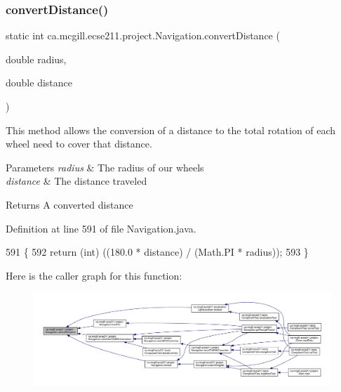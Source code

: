 \subsubsection{\texorpdfstring{convert\+Distance()}{convertDistance()}}
{\footnotesize\ttfamily static int ca.\+mcgill.\+ecse211.\+project.\+Navigation.\+convert\+Distance (\begin{DoxyParamCaption}\item[{double}]{radius,  }\item[{double}]{distance }\end{DoxyParamCaption})\hspace{0.3cm}{\ttfamily [static]}}

This method allows the conversion of a distance to the total rotation of each wheel need to cover that distance.


\begin{DoxyParams}{Parameters}
{\em radius} & The radius of our wheels \\
\hline
{\em distance} & The distance traveled \\
\hline
\end{DoxyParams}
\begin{DoxyReturn}{Returns}
A converted distance 
\end{DoxyReturn}


Definition at line 591 of file Navigation.\+java.


\begin{DoxyCode}
591                                                                     \{
592     \textcolor{keywordflow}{return} (\textcolor{keywordtype}{int}) ((180.0 * distance) / (Math.PI * radius));
593   \}
\end{DoxyCode}
Here is the caller graph for this function\+:
\nopagebreak
\begin{figure}[H]
\begin{center}
\leavevmode
\includegraphics[width=350pt]{classca_1_1mcgill_1_1ecse211_1_1project_1_1_navigation_ac9e260bcd619ffa4820d7d0de7ea1c12_icgraph}
\end{center}
\end{figure}
\mbox{\label{classca_1_1mcgill_1_1ecse211_1_1project_1_1_navigation_a7c66610c5b7496ddb35d342ab2cd3f08}} 
